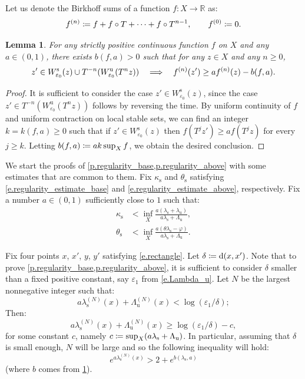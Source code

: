 \documentclass[10pt]{amsart}
\def\vcentcolon{\mathrel{\mathop\ordinarycolon}}
\providecommand\ordinarycolon{:}
\providecommand*\coloneqq{\vcentcolon\mathrel{\mkern-1.2mu}=}
\newcommand\implique{\mathchoice{\Longrightarrow}{\Rightarrow}{\Rightarrow}{\Rightarrow}}
\theoremstyle{plain}
\newtheorem{lemma}[theorem]{Lemma}
\theoremstyle{definition}
\newcommand{\RR}{\mathbb{R}}
\newcommand{\dd}{\mathrm{d}}
\newcommand{\uu}{\mathrm{u}}
\renewcommand{\ss}{\mathrm{s}}
\let\epsilon\varepsilon
\let\phi\varphi
\begin{document}
Let us denote the Birkhoff sums of a function $f \colon X \to \RR$ as:
\[
f^{(n)} \coloneqq f + f \circ T + \cdots + f \circ T^{n-1},
\qquad f^{(0)} \coloneqq 0.
\]

\begin{lemma}\label{l.loss}
For any strictly positive continuous function $f$ on $X$ and any $a \in (0,1)$, there exists $b(f,a)>0$ such that for any $z \in X$ and any $n \ge 0$,
\[
z' \in W^\ss_{\epsilon_0}(z) \cup T^{-n}(W^\uu_{\epsilon_0}(T^n z)) \quad \implique \quad
f^{(n)}(z') \ge a f^{(n)}(z) - b(f,a).
\]
\end{lemma}

\begin{proof}
It is sufficient to consider the case $z' \in W^\ss_{\epsilon_0}(z)$, since the case $z' \in T^{-n}(W^\uu_{\epsilon_0}(T^n z))$ follows by reversing the time.
By uniform continuity of $f$ and uniform contraction on local stable sets, we can find an integer $k = k(f,a) \ge 0$ such that if $z' \in W^\ss_{\epsilon_0}(z)$ then $f(T^j z') \ge a f(T^j z)$ for every $j \ge k$.
Letting $b(f,a) \coloneqq ak \sup_X f$, we obtain the desired conclusion.
\end{proof}

We start the proofs of \cref{p.regularity_base,p.regularity_above} with some estimates that are common to them.
Fix $\kappa_\ss$ and $\theta_\ss$ satisfying \eqref{e.regularity_estimate_base} and \eqref{e.regularity_estimate_above}, respectively.
Fix a number $a\in(0,1)$ sufficiently close to $1$ such that:
\begin{align}
\kappa_{\ss} &< \inf_{X} \frac{a (\lambda_\ss + \lambda_\uu)}{a \lambda_\ss + \Lambda_\uu},
\label{e.folga_base}
\\
\theta_{\ss} &< \inf_{X} \frac{a (\theta \lambda_\ss - \phi)}{a \lambda_\ss + \Lambda_\uu}.
\label{e.folga_above}
\end{align}

Fix four points $x$, $x'$, $y$, $y'$ satisfying \eqref{e.rectangle}.
Let $\delta \coloneqq \dd(x,x')$.
Note that to prove \cref{p.regularity_base,p.regularity_above}, it is sufficient to consider $\delta$ smaller than a fixed positive constant, say $\epsilon_1$ from \eqref{e.Lambda_u}.
Let $N$ be the largest nonnegative integer such that:
\begin{equation}\label{e.optimal}
a \lambda_\ss^{(N)}(x) + \Lambda_\uu^{(N)}(x) < \log(\epsilon_1/\delta) ;
\end{equation}
Then:
\begin{equation}\label{e.optimal_other_side}
a \lambda_\ss^{(N)}(x) + \Lambda_\uu^{(N)}(x) \ge \log(\epsilon_1/\delta) - c,
\end{equation}
for some constant $c$, namely $c \coloneqq \sup_X (a \lambda_\ss + \Lambda_\uu)$.
In particular, assuming that $\delta$ is small enough, $N$ will be large and so the following inequality will hold:
\begin{equation}\label{e.WLOG}
e^{a \lambda_\ss^{(N)}(x)} > 2 + e^{b(\lambda_\ss,a)}
\end{equation}
(where $b$ comes from \cref{l.loss}).
\end{document}
